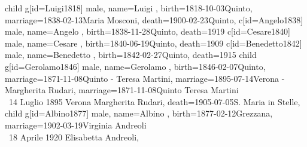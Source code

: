 \documentclass{article}
\begin{document}
\begin{midpage}
\begin{center}
\begin{genealogypicture}
{{{{{{                    }
                    child{
                        g[id=Luigi1818]{
                            male,
                            name={Luigi },
                            birth={1818-10-03}{Quinto},
                            marriage={1838-02-13}{Maria Mosconi},
                            death={1900-02-23}{Quinto},
                        }
                        c[id=Angelo1838]{
                            male,
                            name={Angelo },
                            birth={1838-11-28}{Quinto},
                            death={1919}{}
                        }
                        c[id=Cesare1840]{
                            male,
                            name={Cesare },
                            birth={1840-06-19}{Quinto},
                            death={1909}{}
                        }
                        c[id=Benedetto1842]{
                            male,
                            name={Benedetto },
                            birth={1842-02-27}{Quinto},
                            death={1915}{}
                        }
                        child{
                            g[id=Gerolamo1846]{
                                male,
                                name={Gerolamo },
                                birth={1846-02-07}{Quinto},
                                marriage={1871-11-08}{Quinto - Teresa Martini},
                                marriage={1895-07-14}{Verona - Margherita Rudari},
                                marriage={1871-11-08}{Quinto \newline Teresa Martini \\ \gtrsymMarried~14 Luglio 1895 \newline \hspace*{3mm} Verona \newline \hspace*{3mm} Margherita Rudari},
                                death={1905-07-05}{S. Maria in Stelle},
                            }
                            child{
                                g[id=Albino1877]{
                                    male,
                                    name={Albino },
                                    birth={1877-02-12}{Grezzana},
                                    marriage={1902-03-19}{Virginia Andreoli \\ \gtrsymMarried~18 Aprile 1920 \newline \hspace*{3mm} Elisabetta Andreoli},
}}}}}}}}}
\end{genealogypicture}
\end{center}
\end{midpage}
\end{document}
